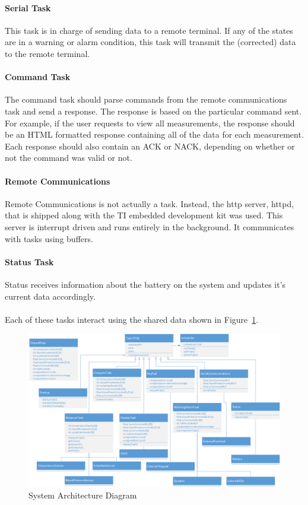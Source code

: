 \documentclass[12pt]{article} %
\begin{document}
    \paragraph{Serial Task} This task is in charge of sending data to
    a remote terminal. If any of the states are in a warning or alarm condition,
    this task will transmit the (corrected) data to the remote terminal.

    \paragraph{Command Task} The command task should parse commands from the 
    remote communications task and send a response.  The response is based
    on the particular command sent.  For example, if the user requests to view
    all measurements, the response should be an HTML formatted response
    containing all of the data for each measurement.  Each response should also
    contain an ACK or NACK, depending on whether or not the command was valid or
    not.

    \paragraph{Remote Communications}  Remote Communications is not actually a
    task.  Instead, the http server, httpd, that is shipped along with the TI
    embedded development kit was used.  This server is interrupt driven and
    runs entirely in the background.  It communicates with tasks using buffers.  

    \paragraph{Status Task} Status receives information about the battery on the
    system and updates it's current data accordingly.
    \\\\
    Each of these tasks interact using the shared data shown in Figure~\ref{fig:arch}. 

    \begin{figure}[h]
      \centering
      \includegraphics[width=\textwidth]{../design/System_Architecture}
      \caption{System Architecture Diagram}
      \label{fig:arch}
    \end{figure}
\end{document}
